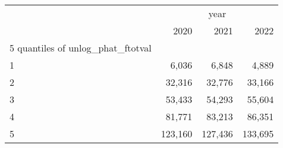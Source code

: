 \begin{tabular}{llll}
\cline{1-4}
\multicolumn{1}{c}{} &
  \multicolumn{3}{|c}{year} \\
\multicolumn{1}{c}{} &
  \multicolumn{1}{|r}{2020} &
  \multicolumn{1}{r}{2021} &
  \multicolumn{1}{r}{2022} \\
\cline{1-4}
\multicolumn{1}{l}{5 quantiles of unlog\_phat\_ftotval} &
  \multicolumn{1}{|r}{} &
  \multicolumn{1}{r}{} &
  \multicolumn{1}{r}{} \\
\multicolumn{1}{l}{\hspace{1em}1} &
  \multicolumn{1}{|r}{6,036} &
  \multicolumn{1}{r}{6,848} &
  \multicolumn{1}{r}{4,889} \\
\multicolumn{1}{l}{\hspace{1em}2} &
  \multicolumn{1}{|r}{32,316} &
  \multicolumn{1}{r}{32,776} &
  \multicolumn{1}{r}{33,166} \\
\multicolumn{1}{l}{\hspace{1em}3} &
  \multicolumn{1}{|r}{53,433} &
  \multicolumn{1}{r}{54,293} &
  \multicolumn{1}{r}{55,604} \\
\multicolumn{1}{l}{\hspace{1em}4} &
  \multicolumn{1}{|r}{81,771} &
  \multicolumn{1}{r}{83,213} &
  \multicolumn{1}{r}{86,351} \\
\multicolumn{1}{l}{\hspace{1em}5} &
  \multicolumn{1}{|r}{123,160} &
  \multicolumn{1}{r}{127,436} &
  \multicolumn{1}{r}{133,695} \\
\cline{1-4}
\end{tabular}

